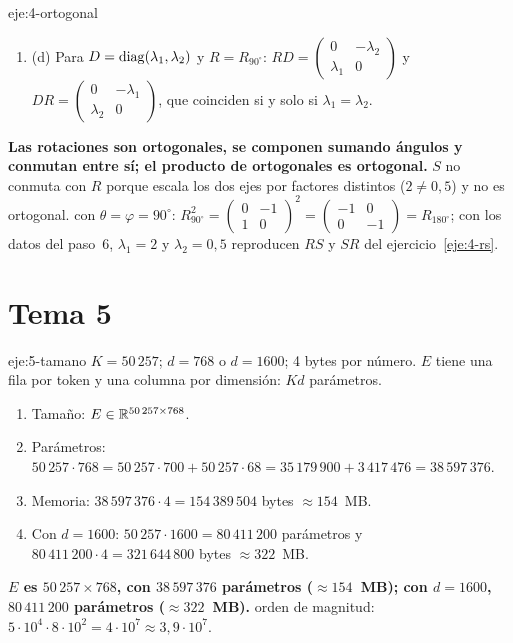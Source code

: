 \begin{solucion}{eje:4-ortogonal}
\begin{enumerate}[label=\arabic*.]
  \item (d) Para $D=\operatorname{diag}(\lambda_1,\lambda_2)$ y $R=R_{90^\circ}$: $RD=\begin{pmatrix}0&-\lambda_2\\ \lambda_1&0\end{pmatrix}$ y $DR=\begin{pmatrix}0&-\lambda_1\\ \lambda_2&0\end{pmatrix}$, que coinciden si y solo si $\lambda_1=\lambda_2$.
\end{enumerate}
\resultado \textbf{Las rotaciones son ortogonales, se componen sumando ángulos y conmutan entre sí; el producto de ortogonales es ortogonal.} $S$ no conmuta con $R$ porque escala los dos ejes por factores distintos ($2\neq 0{,}5$) y no es ortogonal.
\comprobacion con $\theta=\varphi=90^\circ$: $R_{90^\circ}^{2}=\begin{pmatrix}0&-1\\1&0\end{pmatrix}^{2}=\begin{pmatrix}-1&0\\0&-1\end{pmatrix}=R_{180^\circ}$; con los datos del paso~6, $\lambda_1=2$ y $\lambda_2=0{,}5$ reproducen $RS$ y $SR$ del ejercicio~\ref{eje:4-rs}.
\end{solucion}

\section{Tema 5}

\begin{solucion}{eje:5-tamano}
\datos $K=50\,257$; $d=768$ o $d=1600$; 4 bytes por número.
\planteamiento $E$ tiene una fila por token y una columna por dimensión: $Kd$ parámetros.
\pasos
\begin{enumerate}[label=\arabic*.]
  \item Tamaño: $E\in\mathbb{R}^{50\,257\times 768}$.
  \item Parámetros: $50\,257\cdot 768=50\,257\cdot 700+50\,257\cdot 68=35\,179\,900+3\,417\,476=38\,597\,376$.
  \item Memoria: $38\,597\,376\cdot 4=154\,389\,504$ bytes $\approx 154$~MB.
  \item Con $d=1600$: $50\,257\cdot 1600=80\,411\,200$ parámetros y $80\,411\,200\cdot 4=321\,644\,800$ bytes $\approx 322$~MB.
\end{enumerate}
\resultado \textbf{$E$ es $50\,257\times 768$, con $38\,597\,376$ parámetros ($\approx 154$~MB); con $d=1600$, $80\,411\,200$ parámetros ($\approx 322$~MB).}
\comprobacion orden de magnitud: $5\cdot 10^{4}\cdot 8\cdot 10^{2}=4\cdot 10^{7}\approx 3{,}9\cdot 10^{7}$.
\end{solucion}

